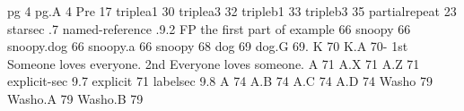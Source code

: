 \relax
\@fd@f pg {{4}}
\@fd@f pg.A {{{}}{{4}}}
\@fd@f Pre {{17}}
\@fd@f triplea1 {{30}}
\@fd@f triplea3 {{32}}
\@fd@f tripleb1 {{33}}
\@fd@f tripleb3 {{35}}
\@fd@f partialrepeat {{23}}
\@fd@f starsec {{.7}}
\@fd@f named-reference {{.9.2}}
\@fd@f FP {{the first part of example 66}}
\@fd@f snoopy {{66}}
\@fd@f snoopy.dog {{{}}{{66}}}
\@fd@f snoopy.a {{{}}{{66}}}
\@fd@f snoopy {{68{\it {}}}}
\@fd@f dog {{69}}
\@fd@f dog.G {{{\number \pexcnt }}{{69.\number \pexcnt }}}
\@fd@f K {{70}}
\@fd@f K.A {{{\number \pexcnt }}{{70-\number \pexcnt }}}
\@fd@f 1st {{Someone loves everyone.}}
\@fd@f 2nd {{Everyone loves someone.}}
\@fd@f A {{71}}
\@fd@f A.X {{{}}{{71}}}
\@fd@f A.Z {{{}}{{71}}}
\@fd@f explicit-sec {{9.7}}
\@fd@f explicit {{{71}\relax }}
\@fd@f labelsec {{9.8}}
\@fd@f A {{74}}
\@fd@f A.B {{{}}{{74}}}
\@fd@f A.C {{{}}{{74}}}
\@fd@f A.D {{{}}{{74}}}
\@fd@f Washo {{79}}
\@fd@f Washo.A {{{}}{{79}}}
\@fd@f Washo.B {{{}}{{79}}}
